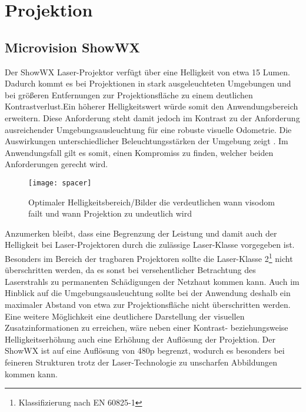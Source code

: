 \section{Projektion}

\subsection{Microvision ShowWX}
Der ShowWX Laser-Projektor verfügt über eine Helligkeit von etwa 15 Lumen. Dadurch kommt es bei Projektionen in stark ausgeleuchteten Umgebungen und bei größeren Entfernungen zur Projektionsfläche zu einem deutlichen Kontrastverlust.\red[ Bild?] Ein höherer Helligkeitswert würde somit den Anwendungsbereich erweitern. Diese Anforderung steht damit jedoch im Kontrast zu der Anforderung ausreichender Umgebungsausleuchtung für eine robuste visuelle Odometrie. Die Auswirkungen unterschiedlicher Beleuchtungsstärken der Umgebung zeigt . Im Anwendungsfall gilt es somit, einen Kompromiss zu finden, welcher beiden Anforderungen gerecht wird.\\

\begin{figure}[!ht]
	\begin{center}
		\texttt{[image: spacer]}
		\caption{Optimaler Helligkeitsbereich/Bilder die verdeutlichen wann visodom failt und wann Projektion zu undeutlich wird}
		\label{fig.optlight}
	\end{center}
\end{figure}

Anzumerken bleibt, dass eine Begrenzung der Leistung und damit auch der Helligkeit bei Laser-Projektoren durch die zulässige Laser-Klasse vorgegeben ist. Besonders im Bereich der tragbaren Projektoren sollte die Laser-Klasse 2\footnote{Klassifizierung nach EN 60825-1} nicht überschritten werden, da es sonst bei versehentlicher Betrachtung des Laserstrahls zu permanenten Schädigungen der Netzhaut kommen kann. Auch im Hinblick auf die  Umgebungsausleuchtung sollte bei der Anwendung deshalb ein maximaler Abstand von etwa \red[TODO] zur Projektionsfläche nicht überschritten werden.\\

Eine weitere Möglichkeit eine deutlichere Darstellung der visuellen Zusatzinformationen zu erreichen, wäre neben einer Kontrast- beziehungsweise Helligkeitserhöhung auch eine Erhöhung der Auflösung der Projektion. Der ShowWX ist auf eine Auflösung von 480p begrenzt, wodurch es besonders bei feineren Strukturen trotz der Laser-Technologie zu unscharfen Abbildungen kommen kann.\\

